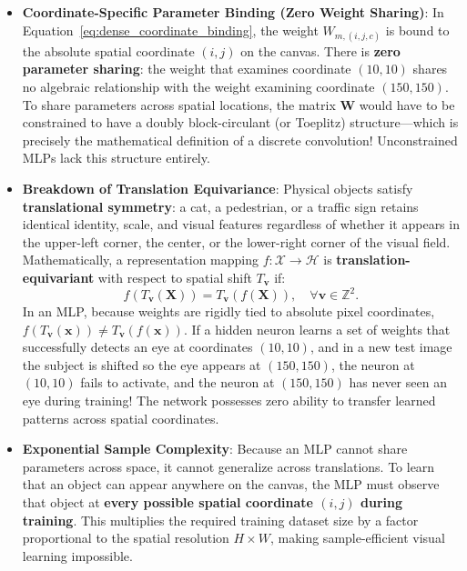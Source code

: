 \begin{itemize}[leftmargin=*]
  \item \textbf{Coordinate-Specific Parameter Binding (Zero Weight Sharing)}: In Equation~\eqref{eq:dense_coordinate_binding}, the weight $W_{m, (i, j, c)}$ is bound to the absolute spatial coordinate $(i, j)$ on the canvas. There is \textbf{zero parameter sharing}: the weight that examines coordinate $(10, 10)$ shares no algebraic relationship with the weight examining coordinate $(150, 150)$. To share parameters across spatial locations, the matrix $\mathbf{W}$ would have to be constrained to have a doubly block-circulant (or Toeplitz) structure---which is precisely the mathematical definition of a discrete convolution! Unconstrained MLPs lack this structure entirely.
  \item \textbf{Breakdown of Translation Equivariance}: Physical objects satisfy \textbf{translational symmetry}: a cat, a pedestrian, or a traffic sign retains identical identity, scale, and visual features regardless of whether it appears in the upper-left corner, the center, or the lower-right corner of the visual field. Mathematically, a representation mapping $f: \mathcal{X} \to \mathcal{H}$ is \textbf{translation-equivariant} with respect to spatial shift $T_{\mathbf{v}}$ if:
  \begin{equation}
  f(T_{\mathbf{v}}(\mathbf{X})) = T_{\mathbf{v}}(f(\mathbf{X})), \quad \forall \mathbf{v} \in \mathbb{Z}^2.
  \end{equation}
  In an MLP, because weights are rigidly tied to absolute pixel coordinates, $f(T_{\mathbf{v}}(\mathbf{x})) \ne T_{\mathbf{v}}(f(\mathbf{x}))$. If a hidden neuron learns a set of weights that successfully detects an eye at coordinates $(10, 10)$, and in a new test image the subject is shifted so the eye appears at $(150, 150)$, the neuron at $(10, 10)$ fails to activate, and the neuron at $(150, 150)$ has never seen an eye during training! The network possesses zero ability to transfer learned patterns across spatial coordinates.
  \item \textbf{Exponential Sample Complexity}: Because an MLP cannot share parameters across space, it cannot generalize across translations. To learn that an object can appear anywhere on the canvas, the MLP must observe that object at \textbf{every possible spatial coordinate $(i, j)$ during training}. This multiplies the required training dataset size by a factor proportional to the spatial resolution $H \times W$, making sample-efficient visual learning impossible.
\end{itemize}

